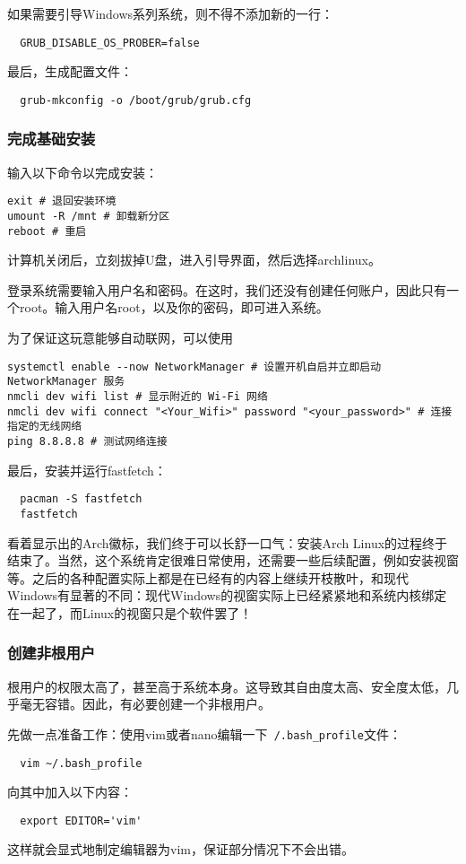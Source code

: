 \documentclass[../main.tex]{subfiles}
\begin{document}
如果需要引导Windows系列系统，则不得不添加新的一行：
\begin{lstlisting}
  GRUB_DISABLE_OS_PROBER=false
\end{lstlisting}

最后，生成配置文件：
\begin{lstlisting}
  grub-mkconfig -o /boot/grub/grub.cfg
\end{lstlisting}

\subsubsection{完成基础安装}

输入以下命令以完成安装：
\begin{lstlisting}
exit # 退回安装环境
umount -R /mnt # 卸载新分区
reboot # 重启
\end{lstlisting}
计算机关闭后，立刻拔掉U盘，进入引导界面，然后选择archlinux。

登录系统需要输入用户名和密码。在这时，我们还没有创建任何账户，因此只有一个root。输入用户名root，以及你的密码，即可进入系统。

为了保证这玩意能够自动联网，可以使用
\begin{lstlisting}
systemctl enable --now NetworkManager # 设置开机自启并立即启动 NetworkManager 服务
nmcli dev wifi list # 显示附近的 Wi-Fi 网络
nmcli dev wifi connect "<Your_Wifi>" password "<your_password>" # 连接指定的无线网络
ping 8.8.8.8 # 测试网络连接
\end{lstlisting}

最后，安装并运行fastfetch：
\begin{lstlisting}
  pacman -S fastfetch
  fastfetch
\end{lstlisting}
看着显示出的Arch徽标，我们终于可以长舒一口气：安装Arch Linux的过程终于结束了。当然，这个系统肯定很难日常使用，还需要一些后续配置，例如安装视窗等。之后的各种配置实际上都是在已经有的内容上继续开枝散叶，和现代Windows有显著的不同：现代Windows的视窗实际上已经紧紧地和系统内核绑定在一起了，而Linux的视窗只是个软件罢了！

\subsubsection{创建非根用户}

根用户的权限太高了，甚至高于系统本身。这导致其自由度太高、安全度太低，几乎毫无容错。因此，有必要创建一个非根用户。

先做一点准备工作：使用vim或者nano编辑一下\texttt{~/.bash\_profile}文件：
\begin{lstlisting}
  vim ~/.bash_profile
\end{lstlisting}
向其中加入以下内容：
\begin{lstlisting}
  export EDITOR='vim'
\end{lstlisting}
这样就会显式地制定编辑器为vim，保证部分情况下不会出错。
\end{document}
